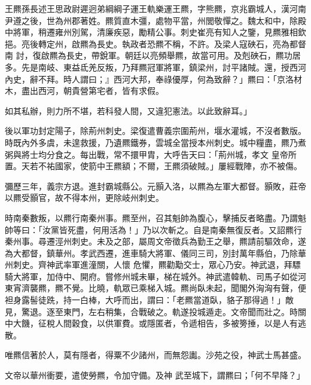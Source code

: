 
\begin{pinyinscope}

 王羆孫長述王思政尉遲迥弟綱綱子運王軌樂運王羆，字熊羆，京兆霸城人，漢河南尹遵之後，世為州郡著姓。羆質直木彊，處物平當，州閭敬憚之。魏太和中，除殿中將軍，稍遷雍州別駕，清廉疾惡，勵精公事。刺史崔亮有知人之鑒，見羆雅相欽挹。亮後轉定州，啟羆為長史。執政者恐羆不稱，不許。及梁人寇硤石，亮為都督南
 討，復啟羆為長史，帶銳軍。朝廷以亮頻舉羆，故當可用。及剋硤石，羆功居多。先是南岐、東益氐羌反叛，乃拜羆冠軍將軍，鎮梁州，討平諸賊。還，授西河內史，辭不拜。時人謂曰；』西河大邦，奉祿優厚，何為致辭？」羆曰：「京洛材木，盡出西河，朝貴營第宅者，皆有求假。



 如其私辦，則力所不堪，若科發人間，又違犯憲法。以此致辭耳。」



 後以軍功封定陽子，除荊州刺史。梁復遣曹義宗圍荊州，堰水灌城，不沒者數版。時既內外多虞，未遑救援，乃遺羆鐵券，雲城全當授本州刺史。城中糧盡，羆乃煮粥與將士均分食之。每出戰，常不擐甲胄，大呼告天曰：「荊州城，孝文
 皇帝所置。天若不祐國家，使箭中王羆額；不爾，王羆須破賊。」屢經戰陣，亦不被傷。



 彌歷三年，義宗方退。進封霸城縣公。元顥入洛，以羆為左軍大都督。顥敗，莊帝以羆受顥官，故不得本州，更除岐州刺史。



 時南秦數叛，以羆行南秦州事。羆至州，召其魁帥為腹心，擊捕反者略盡。乃謂魁帥等曰：「汝黨皆死盡，何用活為！」乃以次斬之。自是南秦無復反者。又詔羆行秦州事。尋遷涇州刺史。未及之部，屬周文帝徵兵為勤王之舉，羆請前驅效命，遂為大都督，鎮華州。孝武西遷，進車騎大將軍、儀同三司，別封萬年縣伯，乃除華州刺史。齊神武率軍進潼關，人懷
 危懼，羆勸勱交士，眾心乃安。神武退，拜驃騎大將軍，加侍中、開府。嘗修州城未畢，梯在城外。神武遣韓軌、司馬子如從河東宵濟襲羆，羆不覺。比曉，軌眾已乘梯入城。羆尚臥未起，聞閣外洶洶有聲，便袒身露髻徒跣，持一白棒，大呼而出，謂曰：「老羆當道臥，貉子那得過！」敵見，驚退。逐至東門，左右稍集，合戰破之。軌遂投城遁走。文帝聞而壯之。時關中大饑，征稅人間穀食，以供軍費。或隱匿者，令遞相告，多被篣捶，以是人有逃散。



 唯羆信著於人，莫有隱者，得粟不少諸州，而無怨讟。沙苑之役，神武士馬甚盛。



 文帝以華州衝要，遣使勞羆，令加守備。及神
 武至城下，謂羆曰；「何不早降？」




\end{pinyinscope}
